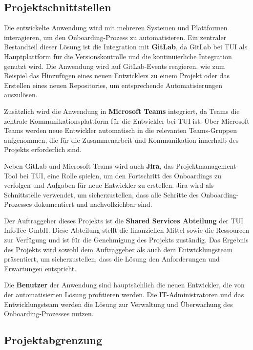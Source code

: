\subsection{Projektschnittstellen} 
\label{sec:Projektschnittstellen}

Die entwickelte Anwendung wird mit mehreren Systemen und Plattformen interagieren, um den Onboarding-Prozess zu automatisieren. Ein zentraler Bestandteil dieser Lösung ist die Integration mit \textbf{GitLab}, da GitLab bei TUI als Hauptplattform für die Versionskontrolle und die kontinuierliche Integration genutzt wird. Die Anwendung wird auf GitLab-Events reagieren, wie zum Beispiel das Hinzufügen eines neuen Entwicklers zu einem Projekt oder das Erstellen eines neuen Repositories, um entsprechende Automatisierungen auszulösen.

Zusätzlich wird die Anwendung in \textbf{Microsoft Teams} integriert, da Teams die zentrale Kommunikationsplattform für die Entwickler bei TUI ist. Über Microsoft Teams werden neue Entwickler automatisch in die relevanten Teams-Gruppen aufgenommen, die für die Zusammenarbeit und Kommunikation innerhalb des Projekts erforderlich sind.

Neben GitLab und Microsoft Teams wird auch \textbf{Jira}, das Projektmanagement-Tool bei TUI, eine Rolle spielen, um den Fortschritt des Onboardings zu verfolgen und Aufgaben für neue Entwickler zu erstellen. Jira wird als Schnittstelle verwendet, um sicherzustellen, dass alle Schritte des Onboarding-Prozesses dokumentiert und nachvollziehbar sind.

Der Auftraggeber dieses Projekts ist die \textbf{Shared Services Abteilung} der TUI InfoTec GmbH. Diese Abteilung stellt die finanziellen Mittel sowie die Ressourcen zur Verfügung und ist für die Genehmigung des Projekts zuständig. Das Ergebnis des Projekts wird sowohl dem Auftraggeber als auch dem Entwicklungsteam präsentiert, um sicherzustellen, dass die Lösung den Anforderungen und Erwartungen entspricht.

Die \textbf{Benutzer} der Anwendung sind hauptsächlich die neuen Entwickler, die von der automatisierten Lösung profitieren werden. Die IT-Administratoren und das Entwicklungsteam werden die Lösung zur Verwaltung und Überwachung des Onboarding-Prozesses nutzen.

\subsection{Projektabgrenzung} 
\label{sec:Projektabgrenzung}

